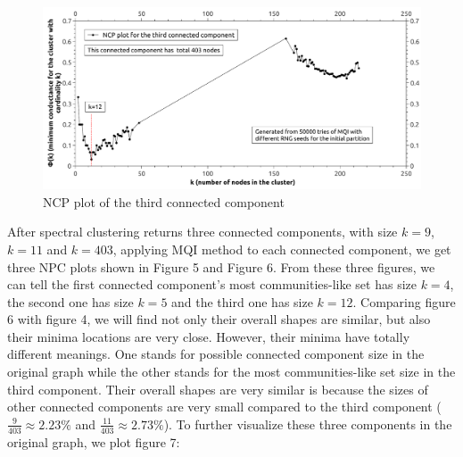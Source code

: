 \documentclass[12pt]{article}
\begin{document}
\begin{figure}[h]
\begin{center}
\includegraphics[scale=0.45]{MQI_3.pdf}
\caption{NCP plot of the third connected component}
\end{center}
\end{figure}
\newpage
After spectral clustering returns three connected components, with size $k=9$, $k=11$ and $k=403$, applying MQI method to each connected component, we get three NPC plots shown in Figure 5 and Figure 6. From these three figures, we can tell the first connected component's most communities-like set has size $k=4$, the second one has size $k=5$ and the third one has size $k=12$. Comparing figure 6 with figure 4, we will find not only their overall shapes are similar, but also their minima locations are very close. However, their minima have totally different meanings. One stands for possible connected component size in the original graph while the other stands for the most communities-like set size in the third component. Their overall shapes are very similar is because the sizes of other connected components are very small compared to the third component ($\frac{9}{403}\approx 2.23\%$ and $\frac{11}{403}\approx 2.73\%$). To further visualize these three components in the original graph, we plot figure 7:
\end{document}
